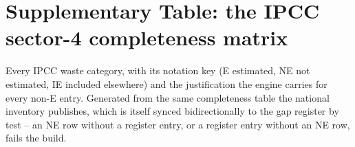 \section{Supplementary Table: the IPCC sector-4 completeness matrix}
\label{app:completeness}

Every IPCC waste category, with its notation key (E estimated, NE not
estimated, IE included elsewhere) and the justification the engine carries
for every non-E entry. Generated from the same completeness table the
national inventory publishes, which is itself synced bidirectionally to the
gap register by test -- an NE row without a register entry, or a register
entry without an NE row, fails the build.

